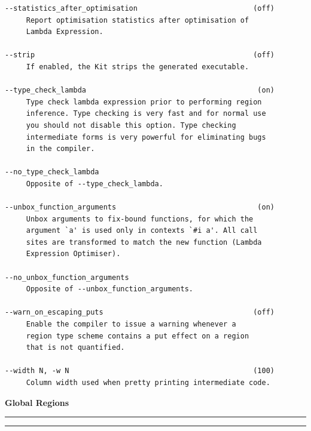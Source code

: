 \documentclass[12pt]{book}
\begin{document}
\begin{verbatim}
--statistics_after_optimisation                           (off)
     Report optimisation statistics after optimisation of
     Lambda Expression.

--strip                                                   (off)
     If enabled, the Kit strips the generated executable.

--type_check_lambda                                        (on)
     Type check lambda expression prior to performing region
     inference. Type checking is very fast and for normal use
     you should not disable this option. Type checking
     intermediate forms is very powerful for eliminating bugs
     in the compiler.

--no_type_check_lambda
     Opposite of --type_check_lambda.

--unbox_function_arguments                                 (on)
     Unbox arguments to fix-bound functions, for which the
     argument `a' is used only in contexts `#i a'. All call 
     sites are transformed to match the new function (Lambda
     Expression Optimiser).

--no_unbox_function_arguments
     Opposite of --unbox_function_arguments.

--warn_on_escaping_puts                                   (off)
     Enable the compiler to issue a warning whenever a 
     region type scheme contains a put effect on a region
     that is not quantified.

--width N, -w N                                           (100)
     Column width used when pretty printing intermediate code.
\end{verbatim}

\newpage
{}
\printindex

\newpage
\begin{center}
\bf Global Regions
\end{center}
\smallskip

\hrule
{}
\hrule
\bigskip
\end{document}
